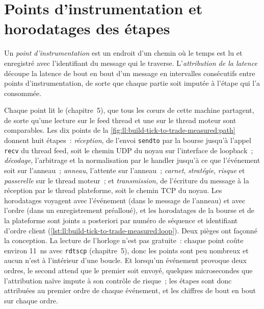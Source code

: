\label{lst:ll:build-tick-to-trade-measured:path}

\section{Points d'instrumentation et horodatages des étapes}

\begin{definition}\label{def:ll:build-tick-to-trade-measured:points}
Un \emph{point d'instrumentation} est un endroit d'un chemin où le temps est lu et enregistré avec
l'identifiant du message qui le traverse. L'\emph{attribution de la latence} découpe la latence de bout en bout d'un message
en intervalles consécutifs entre points d'instrumentation, de sorte que chaque partie soit imputée à l'étape qui l'a consommée.
\end{definition}

Chaque point lit le  (chapitre~5), que tous les cœurs de cette machine partagent, de sorte qu'une lecture sur le feed
thread et une sur le thread moteur sont comparables. Les dix points de la \cref{fig:ll:build-tick-to-trade-measured:path} donnent huit
étapes~: \emph{réception}, de l'envoi \texttt{sendto} par la bourse jusqu'à l'appel \texttt{recv} du thread feed, soit le chemin UDP du noyau sur
l'interface de loopback~; \emph{décodage}, l'arbitrage et la normalisation par le handler jusqu'à ce que l'événement soit sur l'anneau~; \emph{anneau},
l'attente sur l'anneau~; \emph{carnet}, \emph{stratégie}, \emph{risque} et \emph{passerelle} sur le thread moteur~; et \emph{transmission},
de l'écriture du message à la réception par le thread plateforme, soit le chemin TCP du noyau. Les horodatages voyagent avec l'événement (dans le
message de l'anneau) et avec l'ordre (dans un enregistrement préalloué), et les horodatages de la bourse et de la plateforme sont joints a posteriori par
numéro de séquence et identifiant d'ordre client (\cref{lst:ll:build-tick-to-trade-measured:loop}). Deux pièges ont façonné la conception.
La lecture de l'horloge n'est pas gratuite~: chaque point coûte environ \qty{11}{\nano\second} avec \texttt{rdtscp} (chapitre~5), donc les points
sont peu nombreux et aucun n'est à l'intérieur d'une boucle. Et
lorsqu'un événement provoque deux ordres, le second attend que le premier soit envoyé, quelques microsecondes que l'attribution naïve
impute à son contrôle de risque~; les étapes sont donc attribuées au premier ordre de chaque événement, et les chiffres de bout en bout sur
chaque ordre.

